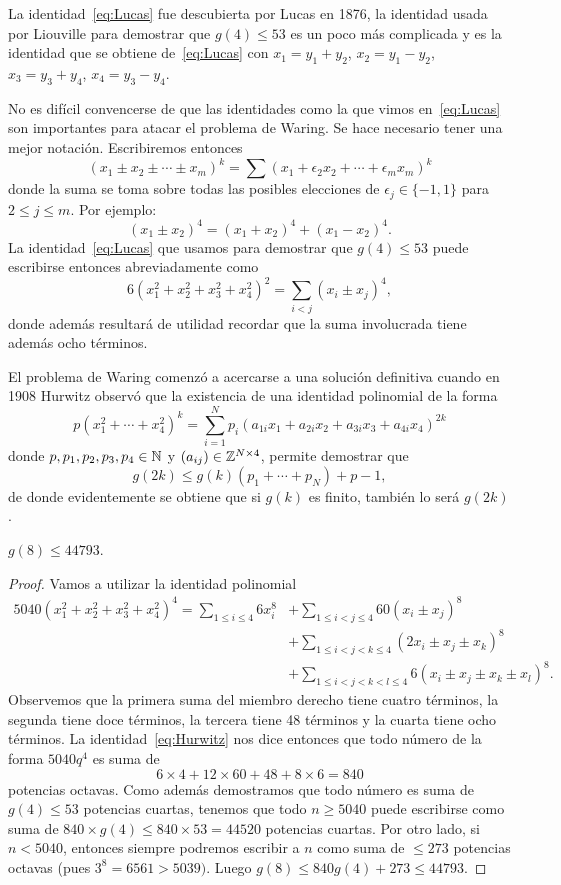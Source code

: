 La identidad~\eqref{eq:Lucas} fue descubierta por Lucas en 1876, la identidad
usada por Liouville para demostrar que $g(4)\leq53$ es un poco más complicada y
es la identidad que se obtiene de~\eqref{eq:Lucas} con $x_1=y_1+y_2$,
$x_2=y_1-y_2$, $x_3=y_3+y_4$, $x_4=y_3-y_4$.

No es difícil convencerse de que las identidades como la que vimos
en~\eqref{eq:Lucas} son importantes para atacar el problema de Waring. Se hace
necesario tener una mejor notación. Escribiremos entonces 
\[
	(x_1\pm x_2\pm\cdots\pm x_m)^k=\sum(x_1+\epsilon_2x_2+\cdots+\epsilon_mx_m)^k
\]
donde la suma se toma sobre todas las posibles elecciones de  
$\epsilon_j\in\{-1,1\}$ para $2\leq j\leq m$. Por ejemplo:
\[
	(x_1\pm x_2)^4=(x_1+x_2)^4+(x_1-x_2)^4.
\]
La identidad~\eqref{eq:Lucas} que usamos para demostrar que $g(4)\leq 53$ puede
escribirse entonces abreviadamente como
\[
	6(x_1^2+x_2^2+x_3^2+x_4^2)^2=\sum_{i<j}(x_i\pm x_j)^4,
\]
donde además resultará de utilidad recordar que la suma involucrada tiene
además ocho términos.

El problema de Waring comenzó a acercarse a una solución definitiva cuando 
en 1908 Hurwitz observó que la existencia de una identidad polinomial
de la forma
\[
	p(x_1^2+\cdots+x_4^2)^k=\sum_{i=1}^N p_i(a_{1i}x_1+a_{2i}x_2+a_{3i}x_3+a_{4i}x_4)^{2k}
\]
donde $p,p_1,p_2,p_3,p_4\in\mathbb{N}$ y $(a_{ij})\in\mathbb{Z}^{N\times 4}$, permite
demostrar que 
\[
	g(2k)\leq g(k)(p_1+\cdots+p_N)+p-1,
\]
de donde evidentemente se obtiene que si $g(k)$ es finito, también lo será
$g(2k)$. 

\begin{theorem}[Hurwitz]
	$g(8)\leq 44793$. 
\end{theorem}

\begin{proof}
	Vamos a utilizar la identidad polinomial
	\begin{equation}
	\label{eq:Hurwitz}
	\begin{aligned}
		5040(x_1^2+x_2^2+x_3^2+x_4^2)^4= \sum_{1\leq i\leq 4}6x_i^8
		&+\sum_{1\leq i<j\leq 4}60(x_i\pm x_j)^8\\
		&+ \sum_{1\leq i<j<k\leq 4}(2x_i\pm x_j\pm x_k)^{8}\\
		&+\sum_{1\leq i<j<k<l\leq 4}6(x_i\pm x_j\pm x_k\pm x_l)^{8}.
	\end{aligned}
	\end{equation}
	Observemos que la primera suma del miembro derecho tiene cuatro términos,
	la segunda tiene doce términos, la tercera tiene 48 términos y la cuarta
	tiene ocho términos.  La identidad~\eqref{eq:Hurwitz} nos dice entonces que
	todo número de la forma $5040q^4$ es suma de 
	\[
		6\times 4+12\times 60+48+8\times 6=840
	\]
	potencias octavas. Como además demostramos que todo número es suma de
	$g(4)\leq 53$ potencias cuartas, tenemos que todo $n\geq 5040$ puede
	escribirse como suma de $840\times g(4)\leq 840\times 53=44520$ potencias
	cuartas. Por otro lado, si $n<5040$, entonces siempre podremos escribir a
	$n$ como suma de $\leq 273$ potencias octavas (pues $3^8=6561>5039)$. Luego 
	$g(8)\leq 840g(4)+273\leq 44793$.
\end{proof}

